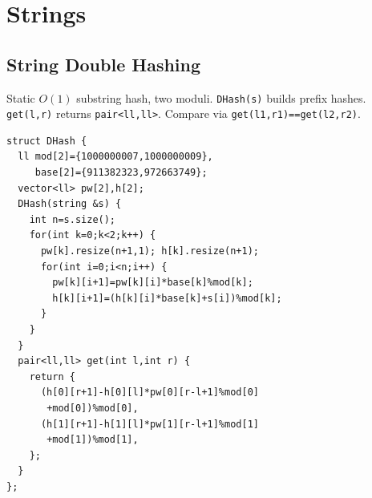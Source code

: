 \section{Strings}
\subsection{String Double Hashing}
Static $O(1)$ substring hash, two moduli. \texttt{DHash(s)} builds prefix hashes. \texttt{get(l,r)} returns \texttt{pair<ll,ll>}. Compare via \texttt{get(l1,r1)==get(l2,r2)}.
\begin{verbatim}
struct DHash {
  ll mod[2]={1000000007,1000000009},
     base[2]={911382323,972663749};
  vector<ll> pw[2],h[2];
  DHash(string &s) {
    int n=s.size();
    for(int k=0;k<2;k++) {
      pw[k].resize(n+1,1); h[k].resize(n+1);
      for(int i=0;i<n;i++) {
        pw[k][i+1]=pw[k][i]*base[k]%mod[k];
        h[k][i+1]=(h[k][i]*base[k]+s[i])%mod[k];
      }
    }
  }
  pair<ll,ll> get(int l,int r) {
    return {
      (h[0][r+1]-h[0][l]*pw[0][r-l+1]%mod[0]
       +mod[0])%mod[0],
      (h[1][r+1]-h[1][l]*pw[1][r-l+1]%mod[1]
       +mod[1])%mod[1],
    };
  }
};
\end{verbatim}
